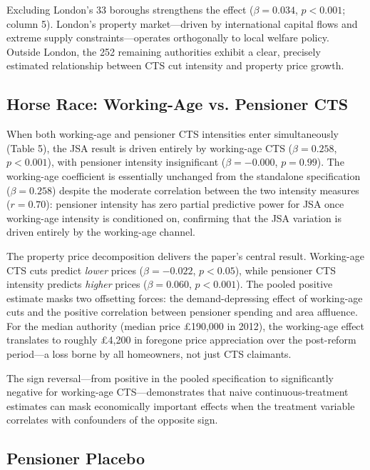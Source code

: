 \documentclass[12pt]{article}
\begin{document}
Excluding London's 33 boroughs strengthens the effect ($\beta = 0.034$, $p < 0.001$; column 5). London's property market---driven by international capital flows and extreme supply constraints---operates orthogonally to local welfare policy. Outside London, the 252 remaining authorities exhibit a clear, precisely estimated relationship between CTS cut intensity and property price growth.

\subsection{Horse Race: Working-Age vs. Pensioner CTS}



When both working-age and pensioner CTS intensities enter simultaneously (Table 5), the JSA result is driven entirely by working-age CTS ($\beta = 0.258$, $p < 0.001$), with pensioner intensity insignificant ($\beta = -0.000$, $p = 0.99$). The working-age coefficient is essentially unchanged from the standalone specification ($\beta = 0.258$) despite the moderate correlation between the two intensity measures ($r = 0.70$): pensioner intensity has zero partial predictive power for JSA once working-age intensity is conditioned on, confirming that the JSA variation is driven entirely by the working-age channel.

The property price decomposition delivers the paper's central result. Working-age CTS cuts predict \textit{lower} prices ($\beta = -0.022$, $p < 0.05$), while pensioner CTS intensity predicts \textit{higher} prices ($\beta = 0.060$, $p < 0.001$). The pooled positive estimate masks two offsetting forces: the demand-depressing effect of working-age cuts and the positive correlation between pensioner spending and area affluence. For the median authority (median price \pounds190,000 in 2012), the working-age effect translates to roughly \pounds4,200 in foregone price appreciation over the post-reform period---a loss borne by all homeowners, not just CTS claimants.

The sign reversal---from positive in the pooled specification to significantly negative for working-age CTS---demonstrates that naive continuous-treatment estimates can mask economically important effects when the treatment variable correlates with confounders of the opposite sign.

\subsection{Pensioner Placebo}
\end{document}
